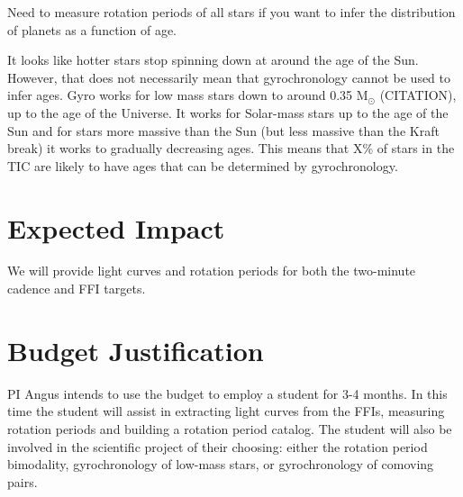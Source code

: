 \documentclass[useAMS, usenatbib, preprint, 12pt]{aastex}
\begin{document}
Need to measure rotation periods of all stars if you want to infer the
distribution of planets as a function of age.

It looks like hotter stars stop spinning down at around the age of the Sun.
However, that does not necessarily mean that gyrochronology cannot be used to
infer ages.
Gyro works for low mass stars down to around 0.35 M$_\odot$ (CITATION), up to
the age of the Universe.
It works for Solar-mass stars up to the age of the Sun and for stars more
massive than the Sun (but less massive than the Kraft break) it works to
gradually decreasing ages.
This means that X\% of stars in the TIC are likely to have ages that can be
determined by gyrochronology.

\section{Expected Impact}
We will provide light curves and rotation periods for both the two-minute
cadence and FFI targets.

\section{Budget Justification}
PI Angus intends to use the budget to employ a student for 3-4 months.
In this time the student will assist in extracting light curves from the FFIs,
measuring rotation periods and building a rotation period catalog.
The student will also be involved in the scientific project of their choosing:
either the rotation period bimodality, gyrochronology of low-mass stars, or
gyrochronology of comoving pairs.
\end{document}
